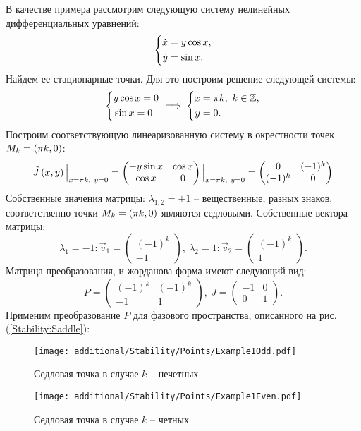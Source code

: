 		В качестве примера рассмотрим следующую систему нелинейных дифференциальных уравнений:
		\[ \left\lbrace \begin{aligned} \dot{x} &= y \cos{x}, \\ \dot{y} &= \sin{x}. \end{aligned} \right. \]
		Найдем ее стационарные точки. Для это построим решение следующей системы:
		\[ \left\lbrace \begin{aligned} &y \cos{x} = 0 \\ &\sin{x} = 0 \end{aligned} \right. \implies \left\lbrace \begin{aligned} x &= \pi k, ~ k \in \mathbb{Z}, \\ y &= 0. \end{aligned} \right. \]
		Построим соответствующую линеаризованную систему в окрестности точек $M_k = \left( \pi k, 0 \right)$:
		\[ 
			\tilde{J} \left( x, y \right) \Bigl\vert \Bigr._{x = \pi k, ~ y = 0} = 
			\begin{pmatrix}
				-y \sin{x} & \cos{x} \\ \cos{x} & 0
			\end{pmatrix} \Bigl\vert \Bigr._{x = \pi k, ~ y = 0} = 
			\begin{pmatrix}
				0 & (-1)^k \\ (-1)^k & 0
			\end{pmatrix}
		\]
		Собственные значения матрицы: $\lambda_{1, 2} = \pm 1$ -- вещественные, разных знаков, соответственно точки $M_k = \left( \pi k, 0 \right)$ являются седловыми. Собственные вектора матрицы:
		\[ \lambda_1 = -1: \vec{v}_1 = \begin{pmatrix} (-1)^k \\ -1 \end{pmatrix}, ~ \lambda_2 = 1: \vec{v}_2 = \begin{pmatrix} (-1)^k \\ 1 \end{pmatrix}. \]
		Матрица преобразования, и жорданова форма имеют следующий вид:
		\[ P = \begin{pmatrix} (-1)^k & (-1)^k \\ -1 & 1 \end{pmatrix}, ~ J = \begin{pmatrix} -1 & 0 \\ 0 & 1 \end{pmatrix}. \]
		Применим преобразование $P$ для фазового пространства, описанного на рис. (\ref{Stability:Saddle}):
		\begin{multicols}{2}

			\begin{figure}[H]
				\centering
				\texttt{[image: additional/Stability/Points/Example1Odd.pdf]}
				\caption{Седловая точка в случае $k$ -- нечетных}
				\label{Stability:Example1Odd}
			\end{figure}

		\columnbreak

			\begin{figure}[H]
				\centering
				\texttt{[image: additional/Stability/Points/Example1Even.pdf]}
				\caption{Седловая точка в случае $k$ -- четных}
				\label{Stability:Example1Even}
			\end{figure}

		\end{multicols}
